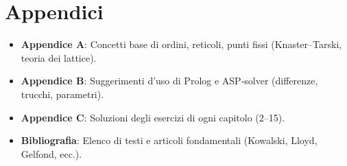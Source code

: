 \documentclass[12pt]{article}
\begin{document}
\section*{Appendici}

\begin{itemize}
  \item \textbf{Appendice A}: Concetti base di ordini, reticoli, punti fissi (Knaster–Tarski, teoria dei lattice).
  \item \textbf{Appendice B}: Suggerimenti d’uso di Prolog e ASP‐solver (differenze, trucchi, parametri).
  \item \textbf{Appendice C}: Soluzioni degli esercizi di ogni capitolo (2--15).
  \item \textbf{Bibliografia}: Elenco di testi e articoli fondamentali (Kowalski, Lloyd, Gelfond, ecc.).
\end{itemize}
\end{document}
